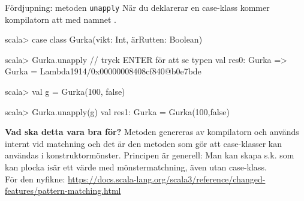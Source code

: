 \begin{Slide}{Fördjupning: metoden \texttt{unapply}}\SlideFontSmall
När du deklarerar en case-klass kommer kompilatorn att  med namnet .
\begin{REPL}
scala> case class Gurka(vikt: Int, ärRutten: Boolean)

scala> Gurka.unapply // tryck ENTER för att se typen
val res0: Gurka => Gurka = Lambda1914/0x00000008408cf840@b0e7bde

scala> val g = Gurka(100, false)

scala> Gurka.unapply(g)
val res1: Gurka = Gurka(100,false)
\end{REPL}
\textbf{Vad ska detta vara bra för?} \pause 
Metoden  genereras av kompilatorn och används internt vid matchning och det är den metoden som gör att case-klasser kan användas i konstruktormönster. Principen är generell: Man kan skapa  s.k.   som kan plocka isär ett värde med mönstermatchning, även utan case-klass. \\För den nyfikne: \url{https://docs.scala-lang.org/scala3/reference/changed-features/pattern-matching.html} 
\end{Slide}
